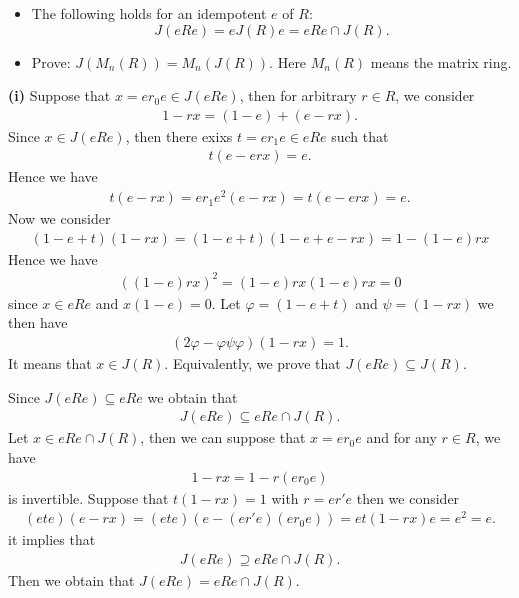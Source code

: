 \begin{itemize}
    \item[(i)] The following holds for an idempotent $e$ of $R$:
    \[ J(eRe) = eJ(R)e = eRe \cap J(R). \]

    \item[(ii)] Prove: $J(M_n(R)) = M_n(J(R))$. Here $M_n(R)$ means the matrix ring.
\end{itemize}
\begin{solution}
    \textbf{(i)} 
    Suppose that $x=er_0e\in J(eRe)$, then for arbitrary $r\in R$, we consider 
    \begin{align*}
        1-rx = (1-e)+(e-rx).
    \end{align*}
    Since $x\in J(eRe)$, then there exixs $t=er_1e\in eRe$ such that 
    \begin{align*}
        t(e-erx) = e.
    \end{align*}
    Hence we have 
    \begin{align*}
        t(e-rx) = er_1e^2(e-rx) = t(e-erx) = e.
    \end{align*}
    Now we consider 
    \begin{align*}
        (1-e+t)(1-rx) = (1-e+t)(1-e+e-rx) = 1-(1-e)rx
    \end{align*}
    Hence we have 
    \begin{align*}
        ((1-e)rx)^2 = (1-e)rx(1-e)rx = 0
    \end{align*}
    since $x\in eRe$ and $x(1-e)=0$.
    Let $\varphi = (1-e+t)$ and $\psi = (1-rx)$ we then have 
    \begin{align*}
        (2\varphi-\varphi\psi\varphi)(1-rx) = 1.
    \end{align*}
    It means that $x\in J(R)$. Equivalently, we prove that $J(eRe)\subseteq J(R)$.

    Since $J(eRe)\subseteq eRe$ we obtain that 
    \begin{align*}
        J(eRe) \subseteq eRe\cap J(R).
    \end{align*}
    Let $x\in eRe\cap J(R)$, then we can suppose that $x=er_0e$ and for any $r\in R$, we have 
    \begin{align*}
        1-rx = 1-r(er_0e)
    \end{align*}
    is invertible. Suppose that $t(1-rx)=1$ with $r=er'e$
    then we consider 
    \begin{align*}
        (ete)(e-rx) = (ete)(e-(er'e)(er_0e)) = et(1-rx)e = e^2 = e.
    \end{align*}
    it implies that 
        \begin{align*}
        J(eRe) \supseteq eRe\cap J(R).
    \end{align*}
    Then we obtain that $J(eRe) = eRe\cap J(R)$. 


\end{solution}
